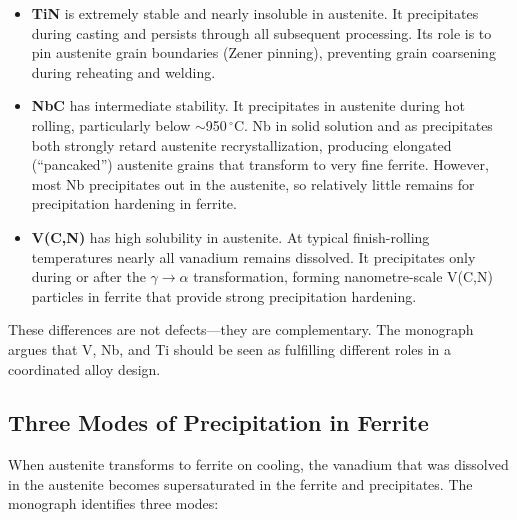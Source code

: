 \documentclass[11pt,a4paper]{article}
\begin{document}
\begin{itemize}
  \item \textbf{TiN} is extremely stable and nearly insoluble in
    austenite.  It precipitates during casting and persists through all
    subsequent processing.  Its role is to pin austenite grain boundaries
    (Zener pinning), preventing grain coarsening during reheating and
    welding.
  \item \textbf{NbC} has intermediate stability.  It precipitates in
    austenite during hot rolling, particularly below
    $\sim$950\,${}^\circ$C.  Nb in solid solution and as precipitates
    both strongly retard austenite recrystallization, producing
    elongated (``pancaked'') austenite grains that transform to very fine
    ferrite.  However, most Nb precipitates out in the austenite, so
    relatively little remains for precipitation hardening in ferrite.
  \item \textbf{V(C,N)} has high solubility in austenite.  At typical
    finish-rolling temperatures nearly all vanadium remains dissolved.  It
    precipitates only during or after the $\gamma\to\alpha$
    transformation, forming nanometre-scale V(C,N) particles in ferrite
    that provide strong precipitation hardening.
\end{itemize}

These differences are not defects---they are complementary.  The
monograph argues that V, Nb, and Ti should be seen as fulfilling
different roles in a coordinated alloy design.

\subsection{Three Modes of Precipitation in Ferrite}

When austenite transforms to ferrite on cooling, the vanadium that was
dissolved in the austenite becomes supersaturated in the ferrite and
precipitates.  The monograph identifies three modes:
\end{document}
